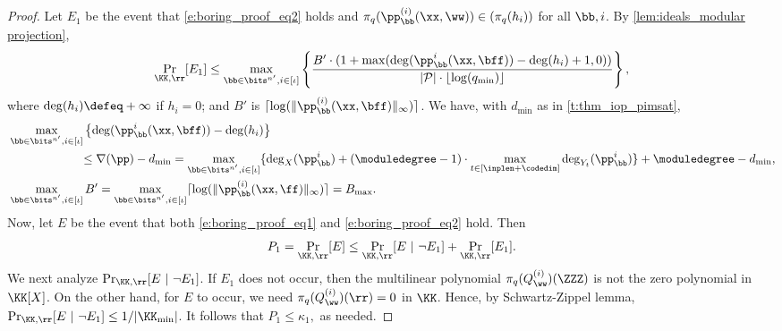 \begin{proof}
Let $E_1$ be the event that \eqref{e:boring_proof_eq2} holds and $\pi_q(\pp_\bb^{(i)}(\xx,\ww))\in (\pi_q(h_i))$ for all $\bb,i$. By \cref{lem:ideals_modular projection}, 
%
$$
\Pr_{\KK,\rr}[E_1] \leq \max_{\bb\in \bits^{n'},i\in[\iota]}\left\{\frac{B'\cdot (1 +\max(\deg(\pp_{\bb}^{i}(\xx,\bff))-\deg(h_{i})+1,0))}{|\mathcal{P}|\cdot \lfloor\log(q_{\min})\rfloor}\right\},
$$
where $\deg(h_{i})\defeq+\infty$ if $h_i=0$; and $B'$ is $\lceil\log(\|\pp_{\bb}^{(i)} (\xx,\bff)\|_\infty)\rceil$. We have, with $d_{\min}$ as in \cref{t:thm_iop_pimsat}, 
%
\begin{align*}
&\max_{\bb\in \bits^{n'},i\in[\iota]}\left\{\deg(\pp_{\bb}^{i}(\xx,\bff))-\deg(h_i)\right\} \\  &\qquad\qquad \qquad \leq\nabla(\pp) -d_{\min}= \max_{\bb\in \bits^{n'}, i\in[\iota]}\{\deg_X(\pp_{\bb}^i) + (\moduledegree-1)\cdot \max_{t\in [\inplen+\codedim\textit{}]}\deg_{Y_t}(\pp_{\bb}^i)\} + \moduledegree -d_{\min},\\
& \max_{\bb\in \bits^{n'}, i\in [\iota]} B' = \max_{\bb\in \bits^{n'}, i\in [\iota]} \lceil\log(\lVert\pp_{\bb}^{(i)}(\xx,\ff)\rVert_{\infty})\rceil = B_{\max}.
\end{align*}
%
Now, let $E$ be the event that both \eqref{e:boring_proof_eq1} and \eqref{e:boring_proof_eq2} hold. Then
%
$$
P_1=\Pr_{\KK,\rr}[E] \leq \Pr_{\KK, \rr}[E \ | \ \neg E_1] + \Pr_{\KK,\rr}[E_1].
$$
%
We next analyze $\Pr_{\KK, \rr}[E \ | \ \neg E_1]$. If $E_1$ does not occur, then the  multilinear polynomial $\pi_q(Q_\ww^{(i)})(\ZZZ)$ is not the zero polynomial in $\KK[X]$. On the other hand, for $E$ to occur, we need  $\pi_q(Q_\ww^{(i)})(\rr)=0$ in $\KK$. Hence, by Schwartz-Zippel lemma,  $\Pr_{\KK, \rr}[E \ | \ \neg E_1] \leq 1/|\KK_{\min}|$. It follows that 
%
$
P_1 \leq \kappa_1,
$ as needed.


\end{proof}
